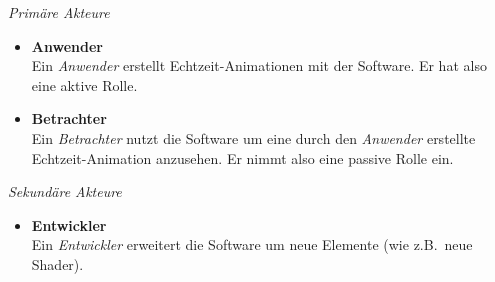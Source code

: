 \textit{Primäre Akteure}
\begin{itemize}
    \item{%
            \textbf{Anwender}\\
            Ein \textit{Anwender} erstellt Echtzeit-Animationen mit der
            Software. Er hat also eine aktive Rolle.
        }
    \item{%
            \textbf{Betrachter}\\
            Ein \textit{Betrachter} nutzt die Software um eine durch den
            \textit{Anwender} erstellte Echtzeit-Animation anzusehen. Er nimmt
            also eine passive Rolle ein.
        }
\end{itemize}
\textit{Sekundäre Akteure}
\begin{itemize}
    \item{%
            \textbf{Entwickler}\\
            Ein \textit{Entwickler} erweitert die Software um neue Elemente
            (wie z.B.\ neue Shader).
        }
\end{itemize}



